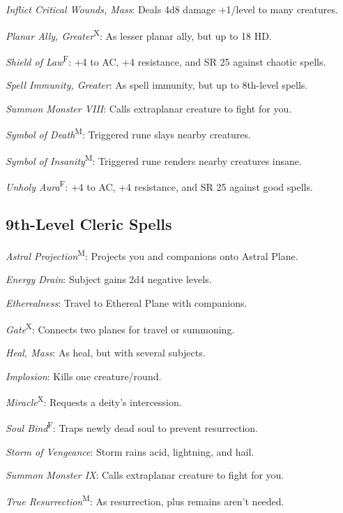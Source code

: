 \textit{Inflict Critical Wounds, Mass}: Deals 4d8 damage +1/level to many creatures.

\textit{Planar Ally, Greater}\textsuperscript{X}: As lesser planar ally, but up to 18 HD.

\textit{Shield of Law}\textsuperscript{F}: +4 to AC, +4 resistance, and SR 25 against chaotic spells.

\textit{Spell Immunity, Greater}: As spell immunity, but up to 8th-level spells.

\textit{Summon Monster VIII}: Calls extraplanar creature to fight for you.

\textit{Symbol of Death}\textsuperscript{M}: Triggered rune slays nearby creatures.

\textit{Symbol of Insanity}\textsuperscript{M}: Triggered rune renders nearby creatures insane.

\textit{Unholy Aura}\textsuperscript{F}: +4 to AC, +4 resistance, and SR 25 against good spells.



\subsection{9th-Level Cleric Spells}

\textit{Astral Projection}\textsuperscript{M}: Projects you and companions onto Astral Plane.

\textit{Energy Drain}: Subject gains 2d4 negative levels.

\textit{Etherealness}: Travel to Ethereal Plane with companions.

\textit{Gate}\textsuperscript{X}: Connects two planes for travel or summoning.

\textit{Heal, Mass}: As heal, but with several subjects.

\textit{Implosion}: Kills one creature/round.

\textit{Miracle}\textsuperscript{X}: Requests a deity's intercession.

\textit{Soul Bind}\textsuperscript{F}: Traps newly dead soul to prevent resurrection.

\textit{Storm of Vengeance}: Storm rains acid, lightning, and hail.

\textit{Summon Monster IX}: Calls extraplanar creature to fight for you.

\textit{True Resurrection}\textsuperscript{M}: As resurrection, plus remains aren't needed.